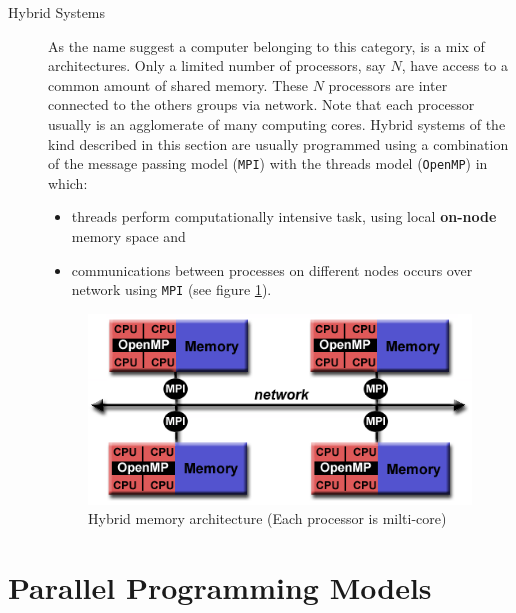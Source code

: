 \begin{description}
\begin{description}
	\item[Hybrid Systems] As the name suggest a computer belonging to this category, is a mix of architectures. Only a limited number of  processors, say $N$, have	access to a common amount of shared memory. These $N$ processors are inter connected to the others groups via network. Note that each processor usually is an agglomerate of many computing cores.
	Hybrid systems of the kind described in this section are usually programmed using a combination of the message passing model (\texttt{MPI}) with the threads model (\texttt{OpenMP}) in which:
	\begin{itemize}
		\item threads perform computationally intensive task, using local
		\textbf{on-node} memory space and
		\item communications between processes on different nodes occurs over network using \texttt{MPI} (see figure \ref{fig:hybridMemory}).
	\end{itemize} 
\begin{figure}
	\centering
	\includegraphics[width=1.0\textwidth]{./images/parallel_programming/hybrid_model}
	\caption{Hybrid memory architecture (Each processor is milti-core)}
	\label{fig:hybridMemory}
\end{figure}
	
\end{description} 
\end{description}

\section{Parallel Programming Models}
